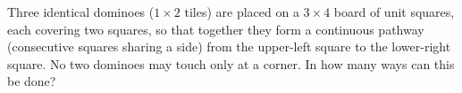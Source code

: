 Three identical dominoes ($1\times 2$ tiles) are placed on a $3\times 4$ board of unit squares, each covering two squares, so that together they form a continuous pathway (consecutive squares sharing a side) from the upper-left square to the lower-right square. No two dominoes may touch only at a corner. In how many ways can this be done?
